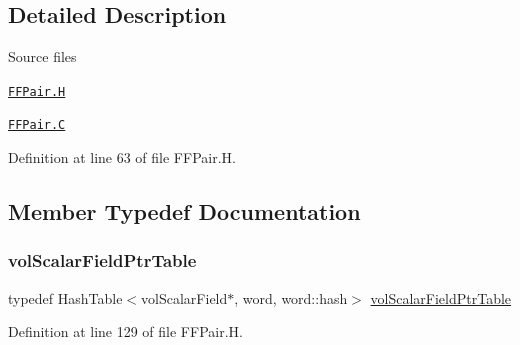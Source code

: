 \subsection{Detailed Description}
\begin{DoxyParagraph}{Source files}

\begin{DoxyItemize}
\item \href{../../../home/carlo/data/GeN-Foam/GeN-Foam_ffn/GeN-Foam/GeN-Foam/classes/thermalHydraulics/src/physicsModels/phasePairs/FFPair.H}{\tt F\+F\+Pair.\+H} 
\item \href{../../../home/carlo/data/GeN-Foam/GeN-Foam_ffn/GeN-Foam/GeN-Foam/classes/thermalHydraulics/src/physicsModels/phasePairs/FFPair.C}{\tt F\+F\+Pair.\+C} 
\end{DoxyItemize}
\end{DoxyParagraph}


Definition at line 63 of file F\+F\+Pair.\+H.



\subsection{Member Typedef Documentation}
\mbox{\label{classFoam_1_1FFPair_a0848121d1a9fe5a3d3471760ef9de2fe}} 
\subsubsection{\texorpdfstring{vol\+Scalar\+Field\+Ptr\+Table}{volScalarFieldPtrTable}}
{\footnotesize\ttfamily typedef Hash\+Table$<$vol\+Scalar\+Field$\ast$, word, word\+::hash$>$ \hyperlink{classFoam_1_1FFPair_a0848121d1a9fe5a3d3471760ef9de2fe}{vol\+Scalar\+Field\+Ptr\+Table}\hspace{0.3cm}{\ttfamily [protected]}}



Definition at line 129 of file F\+F\+Pair.\+H.

\mbox{\label{classFoam_1_1FFPair_a47dacb23df9a151e6da0902f1726ef21}} 
